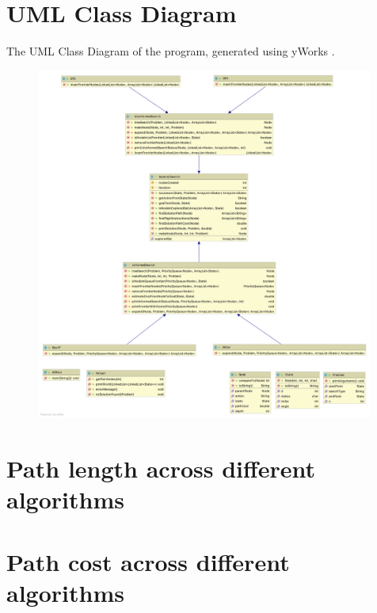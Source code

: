 \documentclass[letterpaper,12pt]{article}
\begin{document}

\newpage
\begin{appendices}

\section{UML Class Diagram}
\label{sec:uml_class_diagram}

The UML Class Diagram of the program, generated using yWorks \cite{yworks}.

\begin{figure}[ht]
\centering
\includegraphics[width=0.99\textwidth]{UML/UML_class_diagram.png}
{\label{fig:uml_class_diagram}}
\end{figure}

\newpage
\section{Path length across different algorithms}
\label{sec:appendix-path-length}


\section{Path cost across different algorithms}
\label{sec:appendix-path-cost}



\end{appendices}
\end{document}
